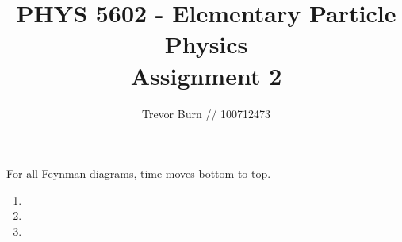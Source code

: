 \documentclass{article}
\title{PHYS 5602 - Elementary Particle Physics \\ Assignment 2}
\author{Trevor Burn // 100712473}
\begin{document}
\maketitle

For all Feynman diagrams, time moves bottom to top.

\begin{enumerate}
	\item 
	\item 
	\item 
\end{enumerate}
\end{document}
